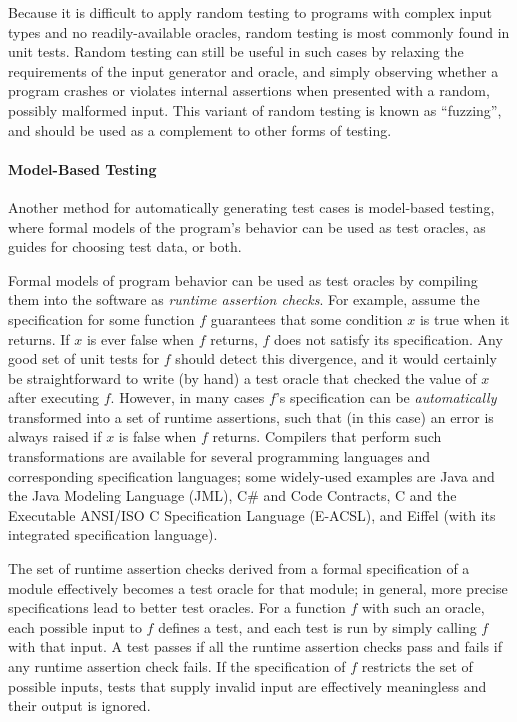 Because it is difficult to apply random testing to programs with
complex input types and no readily-available oracles, random testing
is most commonly found in unit tests. Random testing can still be
useful in such cases by relaxing the requirements of the input
generator and oracle, and simply observing whether a program crashes
or violates internal assertions when presented with a random, possibly
malformed input. This variant of random testing is known as
``fuzzing'', and should be used as a complement to other forms of
testing.

\paragraph{Model-Based Testing}

Another method for automatically generating test cases is model-based
testing, where formal models of the program's behavior can be used as
test oracles, as guides for choosing test data, or both.

Formal models of program behavior can be used as test oracles by
compiling them into the software as \emph{runtime assertion
  checks}. For example, assume the specification for some function $f$
guarantees that some condition $x$ is true when it returns. If $x$ is
ever false when $f$ returns, $f$ does not satisfy its
specification. Any good set of unit tests for $f$ should detect this
divergence, and it would certainly be straightforward to write (by
hand) a test oracle that checked the value of $x$ after executing
$f$. However, in many cases $f$'s specification can be
\emph{automatically} transformed into a set of runtime assertions,
such that (in this case) an error is always raised if $x$ is false
when $f$ returns.  Compilers that perform such transformations are
available for several programming languages and corresponding
specification languages; some widely-used examples are Java and the
Java Modeling Language (JML), C\# and Code Contracts, C and the
Executable ANSI/ISO C Specification Language (E-ACSL), and Eiffel
(with its integrated specification language).

The set of runtime assertion checks derived from a formal
specification of a module effectively becomes a test oracle for that
module; in general, more precise specifications lead to better test
oracles. For a function $f$ with such an oracle, each possible input
to $f$ defines a test, and each test is run by simply calling $f$ with
that input. A test passes if all the runtime assertion checks pass and
fails if any runtime assertion check fails. If the specification of
$f$ restricts the set of possible inputs, tests that supply invalid
input are effectively meaningless and their output is ignored.

